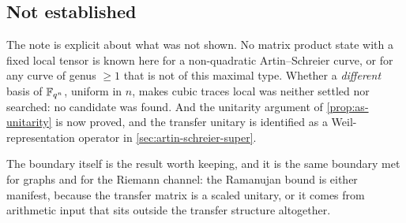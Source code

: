 \subsection{Not established}

The note is explicit about what was not shown. No matrix product state with a
fixed local tensor is known here for a non-quadratic Artin--Schreier curve, or
for any curve of genus $\ge1$ that is not of this maximal type. Whether a
\emph{different} basis of $\mathbb F_{q^{n}}$, uniform in $n$, makes cubic traces local
was neither settled nor searched: no candidate was found. And the unitarity
argument of \cref{prop:as-unitarity} is now proved, and the transfer unitary is
identified as a Weil-representation operator in \cref{sec:artin-schreier-super}.

The boundary itself is the result worth keeping, and it is the same boundary
met for graphs and for the Riemann channel: the Ramanujan bound is either
manifest, because the transfer matrix is a scaled unitary, or it comes from
arithmetic input that sits outside the transfer structure altogether.
